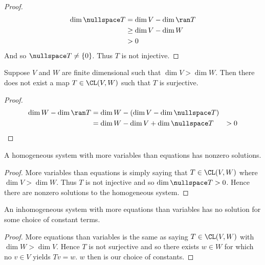 \documentclass{article}
\begin{document}
  \begin{proof}
    \begin{align*}
      \dim\nullspace T & = \dim V - \dim\ran T \\
      & \geq \dim V - \dim W \\
      & > 0
    \end{align*}
    And so $\nullspace T \neq \{0\}$. Thus $T$ is not injective.
  \end{proof}
  \begin{prop}
    Suppose $V$ and $W$ are finite dimensional such that $\dim V > \dim W$. Then there does not exist a map $T \in \CL(V, W)$ such that $T$ is surjective.
  \end{prop}
  \begin{proof}
    \begin{align*}
      \dim W - \dim\ran T & = \dim W - (\dim V - \dim\nullspace T) \\
      & = \dim W - \dim V + \dim\nullspace T
      & > 0
    \end{align*}
  \end{proof}
  \begin{prop}
    A homogeneous system with more variables than equations has nonzero solutions.
  \end{prop}
  \begin{proof}
    More variables than equations is simply saying that $T \in \CL(V, W)$ where $\dim V > \dim W$. Thus $T$ is not injective and so $\dim\nullspace T > 0$. Hence there are nonzero solutions to
    the homogeneous system.
  \end{proof}
  \begin{prop}
    An inhomogeneous system with more equations than variables has no solution for some choice of constant terms.
  \end{prop}
  \begin{proof}
    More equations than variables is the same as saying $T \in \CL(V, W)$ with $\dim W > \dim V$. Hence $T$ is not surjective and so there exists $w \in W$ for which no $v \in V$ yields $Tv
    = w$. $w$ then is our choice of constants.
  \end{proof}
\end{document}
